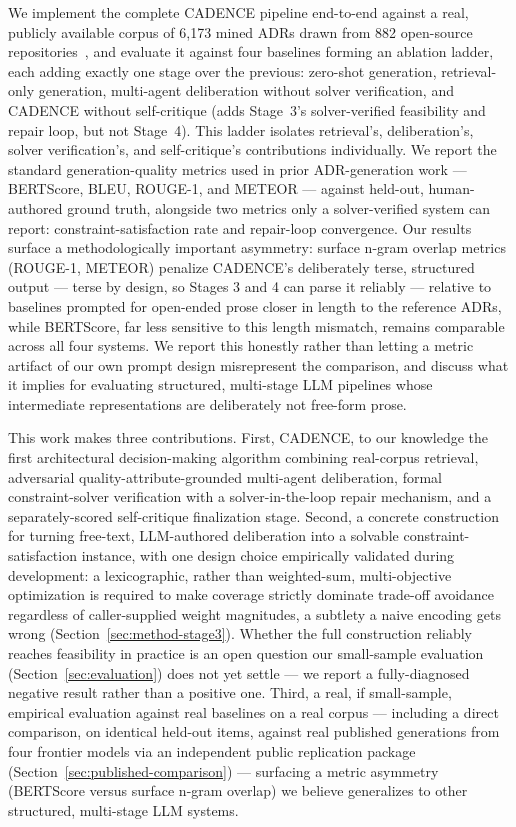 \documentclass[preprint,12pt,authoryear]{elsarticle}
\renewcommand{\_}{\textunderscore\allowbreak{}}
\begin{document}
We implement the complete CADENCE pipeline end-to-end against a real, publicly available corpus of 6{,}173 mined ADRs drawn from 882 open-source repositories~\citep{buchgeher2023adr}, and evaluate it against four baselines forming an ablation ladder, each adding exactly one stage over the previous: zero-shot generation, retrieval-only generation, multi-agent deliberation without solver verification, and CADENCE without self-critique (adds Stage~3's solver-verified feasibility and repair loop, but not Stage~4). This ladder isolates retrieval's, deliberation's, solver verification's, and self-critique's contributions individually. We report the standard generation-quality metrics used in prior ADR-generation work --- BERTScore, BLEU, ROUGE-1, and METEOR --- against held-out, human-authored ground truth, alongside two metrics only a solver-verified system can report: constraint-satisfaction rate and repair-loop convergence. Our results surface a methodologically important asymmetry: surface n-gram overlap metrics (ROUGE-1, METEOR) penalize CADENCE's deliberately terse, structured output --- terse by design, so Stages 3 and 4 can parse it reliably --- relative to baselines prompted for open-ended prose closer in length to the reference ADRs, while BERTScore, far less sensitive to this length mismatch, remains comparable across all four systems. We report this honestly rather than letting a metric artifact of our own prompt design misrepresent the comparison, and discuss what it implies for evaluating structured, multi-stage LLM pipelines whose intermediate representations are deliberately not free-form prose.

This work makes three contributions. First, CADENCE, to our knowledge the first architectural decision-making algorithm combining real-corpus retrieval, adversarial quality-attribute-grounded multi-agent deliberation, formal constraint-solver verification with a solver-in-the-loop repair mechanism, and a separately-scored self-critique finalization stage. Second, a concrete construction for turning free-text, LLM-authored deliberation into a solvable constraint-satisfaction instance, with one design choice empirically validated during development: a lexicographic, rather than weighted-sum, multi-objective optimization is required to make coverage strictly dominate trade-off avoidance regardless of caller-supplied weight magnitudes, a subtlety a naive encoding gets wrong (Section~\ref{sec:method-stage3}). Whether the full construction reliably reaches feasibility in practice is an open question our small-sample evaluation (Section~\ref{sec:evaluation}) does not yet settle --- we report a fully-diagnosed negative result rather than a positive one. Third, a real, if small-sample, empirical evaluation against real baselines on a real corpus --- including a direct comparison, on identical held-out items, against real published generations from four frontier models via an independent public replication package (Section~\ref{sec:published-comparison}) --- surfacing a metric asymmetry (BERTScore versus surface n-gram overlap) we believe generalizes to other structured, multi-stage LLM systems.
\end{document}
